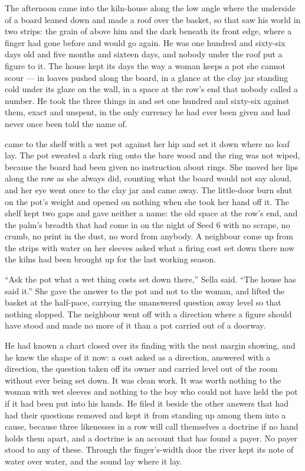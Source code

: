 
The afternoon came into the kiln-house along the low angle where the underside of a board leaned down and made a roof over the basket, so that  saw his world in two strips: the grain of  above him and the dark beneath its front edge, where a finger had gone before and would go again. He was one hundred and sixty-six days old and five months and sixteen days, and nobody under the roof put a figure to it. The house kept its days the way a woman keeps a pot she cannot scour --- in loaves pushed along the board, in a glance at the clay jar standing cold under its glaze on the wall, in a space at the row's end that nobody called a number. He took the three things in and set one hundred and sixty-six against them, exact and unspent, in the only currency he had ever been given and had never once been told the name of.

 came to the shelf with a wet pot against her hip and set it down where no loaf lay. The pot sweated a dark ring onto the bare wood and the ring was not wiped, because the board had been given no instruction about rings. She moved her lips along the row as she always did, counting what the board would not say aloud, and her eye went once to the clay jar and came away. The little-door burn shut on the pot's weight and opened on nothing when she took her hand off it. The shelf kept two gaps and gave neither a name: the old space at the row's end, and the palm's breadth that had come in on the night of Seed 6 with no scrape, no crumb, no print in the dust, no word from anybody. A neighbour come up from the strips with water on her sleeves asked what a firing cost set down there now the kilns had been brought up for the last working season.

“Ask the pot what a wet thing costs set down there,” Sella said. “The house has said it.” She gave the answer to the pot and not to the woman, and lifted the basket at the half-pace, carrying the unanswered question away level so that nothing slopped. The neighbour went off with a direction where a figure should have stood and made no more of it than a pot carried out of a doorway.

He had known a chart closed over its finding with the neat margin showing, and he knew the shape of it now: a cost asked as a direction, answered with a direction, the question taken off its owner and carried level out of the room without ever being set down. It was clean work. It was worth nothing to the woman with wet sleeves and nothing to the boy who could not have held the pot if it had been put into his hands. He filed it beside the other answers that had had their questions removed and kept it from standing up among them into a cause, because three likenesses in a row will call themselves a doctrine if no hand holds them apart, and a doctrine is an account that has found a payer. No payer stood to any of these. Through the finger's-width door the river kept its note of water over water, and the sound lay where it lay.

